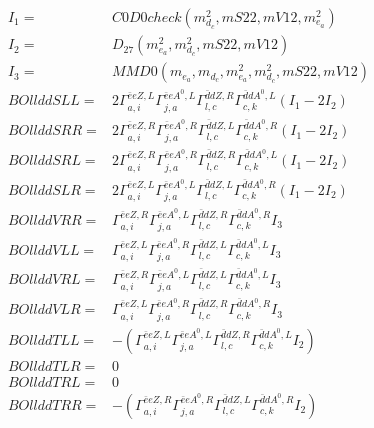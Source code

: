 \documentclass[A4,landscape]{article}
\begin{document}
\begin{align} 
I_1 = & C0D0check(m^2_{d_{{c}}}, mS22, mV12, m^2_{e_{{a}}}) \\ 
I_2 = & D_{27}(m^2_{e_{{a}}}, m^2_{d_{{c}}}, mS22, mV12) \\ 
I_3 = & MMD0(m_{e_{{a}}}, m_{d_{{c}}}, m^2_{e_{{a}}}, m^2_{d_{{c}}}, mS22, mV12) \\ 
  BOllddSLL= & 2  \Gamma^{\bar{e}e Z ,L}_{a, i} \Gamma^{\bar{e}e A^0 ,L}_{j, a} \Gamma^{\bar{d}d Z ,R}_{l, c} \Gamma^{\bar{d}d A^0 ,L}_{c, k} (I_1 - 2 I_2) \\ 
  BOllddSRR= & 2  \Gamma^{\bar{e}e Z ,R}_{a, i} \Gamma^{\bar{e}e A^0 ,R}_{j, a} \Gamma^{\bar{d}d Z ,L}_{l, c} \Gamma^{\bar{d}d A^0 ,R}_{c, k} (I_1 - 2 I_2) \\ 
  BOllddSRL= & 2  \Gamma^{\bar{e}e Z ,R}_{a, i} \Gamma^{\bar{e}e A^0 ,R}_{j, a} \Gamma^{\bar{d}d Z ,R}_{l, c} \Gamma^{\bar{d}d A^0 ,L}_{c, k} (I_1 - 2 I_2) \\ 
  BOllddSLR= & 2  \Gamma^{\bar{e}e Z ,L}_{a, i} \Gamma^{\bar{e}e A^0 ,L}_{j, a} \Gamma^{\bar{d}d Z ,L}_{l, c} \Gamma^{\bar{d}d A^0 ,R}_{c, k} (I_1 - 2 I_2) \\ 
  BOllddVRR= &  \Gamma^{\bar{e}e Z ,R}_{a, i} \Gamma^{\bar{e}e A^0 ,L}_{j, a} \Gamma^{\bar{d}d Z ,R}_{l, c} \Gamma^{\bar{d}d A^0 ,R}_{c, k} I_3 \\ 
  BOllddVLL= &  \Gamma^{\bar{e}e Z ,L}_{a, i} \Gamma^{\bar{e}e A^0 ,R}_{j, a} \Gamma^{\bar{d}d Z ,L}_{l, c} \Gamma^{\bar{d}d A^0 ,L}_{c, k} I_3 \\ 
  BOllddVRL= &  \Gamma^{\bar{e}e Z ,R}_{a, i} \Gamma^{\bar{e}e A^0 ,L}_{j, a} \Gamma^{\bar{d}d Z ,L}_{l, c} \Gamma^{\bar{d}d A^0 ,L}_{c, k} I_3 \\ 
  BOllddVLR= &  \Gamma^{\bar{e}e Z ,L}_{a, i} \Gamma^{\bar{e}e A^0 ,R}_{j, a} \Gamma^{\bar{d}d Z ,R}_{l, c} \Gamma^{\bar{d}d A^0 ,R}_{c, k} I_3 \\ 
  BOllddTLL= & -( \Gamma^{\bar{e}e Z ,L}_{a, i} \Gamma^{\bar{e}e A^0 ,L}_{j, a} \Gamma^{\bar{d}d Z ,R}_{l, c} \Gamma^{\bar{d}d A^0 ,L}_{c, k} I_2) \\ 
  BOllddTLR= & 0 \\ 
  BOllddTRL= & 0 \\ 
  BOllddTRR= & -( \Gamma^{\bar{e}e Z ,R}_{a, i} \Gamma^{\bar{e}e A^0 ,R}_{j, a} \Gamma^{\bar{d}d Z ,L}_{l, c} \Gamma^{\bar{d}d A^0 ,R}_{c, k} I_2) \\ 
\end{align} 
\end{document}
